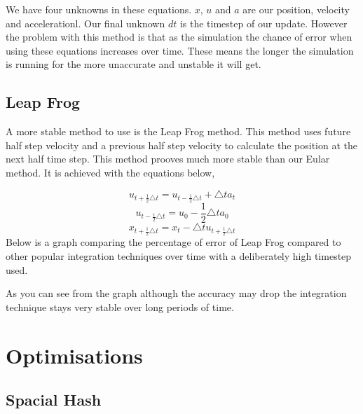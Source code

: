 We have four unknowns in these equations. $x$, $u$ and $a$ are our position, velocity and accelerationl. Our final unknown $dt$ is the timestep of our update. However the problem with this method is that as the simulation the chance of error when using these equations increases over time. These means the longer the simulation is running for the more unaccurate and unstable it will get. \subsection*{Leap Frog }

A more stable method to use is the Leap Frog method. This method uses future half step velocity and a previous half step velocity to calculate the position at the next half time step. This method prooves much more stable than our Eular method. It is achieved with the equations below,\par
 \[ u_{t+\frac{1}{2} \triangle t} = u_{t- \frac{1}{2} \triangle t} + \triangle t a_t \] \[ u_{t-\frac{1}{2} \triangle t} = u_0 - \frac{1}{2}\triangle t a_0 \] \[ x_{t+\frac{1}{2} \triangle t} = x_t - \triangle tu_{t+\frac{1}{2} \triangle t} \] Below is a graph comparing the percentage of error of Leap Frog compared to other popular integration techniques over time with a deliberately high timestep used.\par
As you can see from the graph although the accuracy may drop the integration technique stays very stable over long periods of time.

\section*{Optimisations }

\subsection*{Spacial Hash }